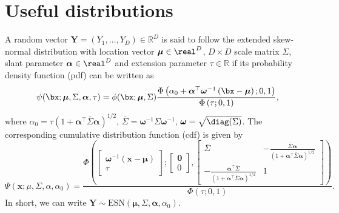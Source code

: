 \documentclass[12pt]{article}
\begin{document}
\section{Useful distributions}

\begin{definition}

A random vector $\bm Y=(Y_1,\dots, Y_D) \in \mathbb{R}^D$ is said to follow the extended skew-normal distribution with location vector $\bm\mu \in \real^D$, $D \times D$ scale matrix $\Sigma$, slant parameter $\bm \alpha \in \real^D$ and extension parameter $\tau \in \mathbb{R}$ if its probability density function (pdf) can be written as
%
$$
\psi(\bx;\bm \mu,\Sigma,\bm \alpha,\tau) = 
\phi(\bx;\bm \mu,\Sigma) 
\frac{\Phi\left(\alpha_0 + \bm\alpha^\top \bm \omega^{-1}\left(\bx-\bm\mu\right); 0, 1\right)}{\Phi\left(\tau; 0, 1\right)},
$$
%
where $\alpha_0 = \tau \left(1+\bm\alpha^\top\bar\Sigma\bm\alpha \right)^{1/2}$, $\bar\Sigma = \bm \omega^{-1}\Sigma \bm \omega^{-1}$, $\bm \omega = \sqrt{\diag(\Sigma)}$.
%
The corresponding cumulative distribution function (cdf) is given by
%
\begin{equation*}
    \Psi(\bm x;\mu,\Sigma,\alpha,\alpha_0) =
    \frac{\Phi \left(
    \begin{bmatrix} 
        \bm \omega^{-1}( \bm x- \bm \mu)  \\
        \tau
    \end{bmatrix};
    \begin{bmatrix} 
    \bm 0 \\ 0
    \end{bmatrix},
    \begin{bmatrix}
        \bar\Sigma & -\frac{\bar{\Sigma}\bm\alpha}{(1+\bm\alpha^\top\bar{\Sigma}\bm\alpha)^{1/2}} \\
       -\frac{\bm\alpha^\top\bar{\Sigma}}{\left(1+\bm\alpha^\top\bar{\Sigma}\bm\alpha\right)^{1/2}} &	1
    \end{bmatrix} \right)
    }
    {\Phi\left(\tau; 0, 1\right)}.
\end{equation*}
%
In short, we can write $\bm Y \sim \text{ESN}(\bm\mu,\Sigma,\bm\alpha,\alpha_0)$.
\end{definition}
\end{document}
